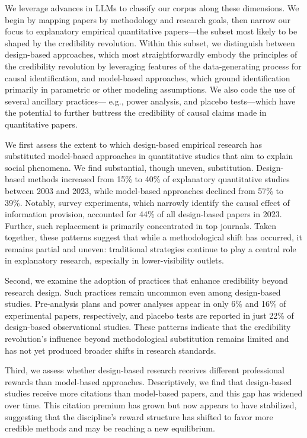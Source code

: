 \documentclass[12pt]{article}
\begin{document}
We leverage advances in LLMs to classify our corpus along these dimensions. We begin by mapping papers by methodology and research goals, then narrow our focus to explanatory empirical quantitative papers—the subset most likely to be shaped by the credibility revolution. Within this subset, we distinguish between design-based approaches, which most straightforwardly embody the principles of the credibility revolution by leveraging features of the data-generating process for causal identification, and model-based approaches, which ground identification primarily in parametric or other modeling assumptions. We also code the use of several ancillary practices--- e.g., power analysis, and placebo tests---which have the potential to further buttress the credibility of causal claims made in quantitative papers.

We first assess the extent to which design-based empirical research has substituted model-based approaches in quantitative studies that aim to explain social phenomena. We find substantial, though uneven, substitution. Design-based methods increased from 15\% to 40\% of explanatory quantitative studies between 2003 and 2023, while model-based approaches declined from 57\% to 39\%. Notably, survey experiments, which narrowly identify the causal effect of information provision, accounted for 44\% of all design-based papers in 2023. Further, such replacement is primarily concentrated in top journals. Taken together, these patterns suggest that while a methodological shift has occurred, it remains partial and uneven: traditional strategies continue to play a central role in explanatory research, especially in lower-visibility outlets.

Second, we examine the adoption of practices that enhance credibility beyond research design. Such practices remain uncommon even among design-based studies. Pre-analysis plans and power analyses appear in only 6\% and 16\% of experimental papers, respectively, and placebo tests are reported in just 22\% of design-based observational studies. These patterns indicate that the credibility revolution’s influence beyond methodological substitution remains limited and has not yet produced broader shifts in research standards.

Third, we assess whether design-based research receives different professional rewards than model-based approaches. Descriptively, we find that design-based studies receive more citations than model-based papers, and this gap has widened over time. This citation premium has grown but now appears to have stabilized, suggesting that the discipline’s reward structure has shifted to favor more credible methods and may be reaching a new equilibrium.
\end{document}
